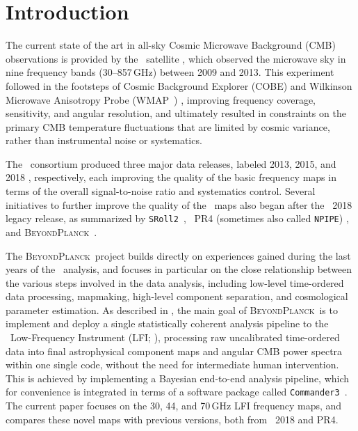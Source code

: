 \documentclass[twocolumn]{aa}
\def\WMAP{WMAP}
\def\commanderthree{\texttt{Commander3}}
\newcommand{\BP}{\textsc{BeyondPlanck}}
\newcommand{\srollTwo}[0]{\texttt{SRoll2}}
\begin{document}

\maketitle


\section{Introduction}
\label{sec:introduction}

The current state of the art in all-sky Cosmic Microwave Background (CMB) observations is provided
by the \Planck\ satellite \citep{planck2016-l01}, which observed the
microwave sky in nine frequency bands (30--857\,GHz) between 2009 and
2013. This experiment followed in the footsteps of Cosmic Background 
Explorer (COBE) \citep{1982OptEn..21..769M} and  Wilkinson Microwave 
Anisotropy Probe (\WMAP\ ) \citep{2003ApJ...583....1B},
improving frequency coverage, sensitivity, and angular resolution,
and ultimately resulted in constraints on the primary CMB temperature fluctuations that are limited by cosmic
variance, rather than instrumental noise or systematics.

The \Planck\ consortium produced three major data releases, labeled
2013, 2015, and 2018
\citep{planck2013-p02,planck2014-a03,planck2016-l02}, respectively,
each improving the quality of the basic frequency maps in terms of the
overall signal-to-noise ratio and systematics control. Several
initiatives to further improve the quality of the \Planck\ maps also 
began after the \Planck\ 2018 legacy release, as summarized
by \srollTwo\ \citep{2019A&A...629A..38D}, \Planck\ PR4 (sometimes
also called \texttt{NPIPE}) \citep{npipe}, and \BP\ \citep{bp01}.

The \BP\ project builds
directly on experiences gained during the last years of the
\Planck\ analysis, and focuses in particular on the close relationship between the various steps involved in the data analysis, including low-level time-ordered data processing, mapmaking, high-level component separation, and cosmological parameter estimation.
 As described in \citet{bp01}, the main goal of \BP\ is to
implement and deploy a single statistically coherent analysis pipeline
to the \Planck\ Low-Frequency Instrument (LFI;
\citealp{planck2016-l02}), processing raw uncalibrated time-ordered
data into final astrophysical component maps and angular CMB power
spectra within one single code, without the need for intermediate
human intervention.  This is achieved by implementing a Bayesian
end-to-end analysis pipeline, which for convenience is integrated in
terms of a software package called \commanderthree\ \citep{bp03}. The
current paper focuses on the 30, 44, and 70\,GHz LFI frequency maps,
and compares these novel maps with previous versions, both from
\Planck\ 2018 and PR4.
\end{document}
